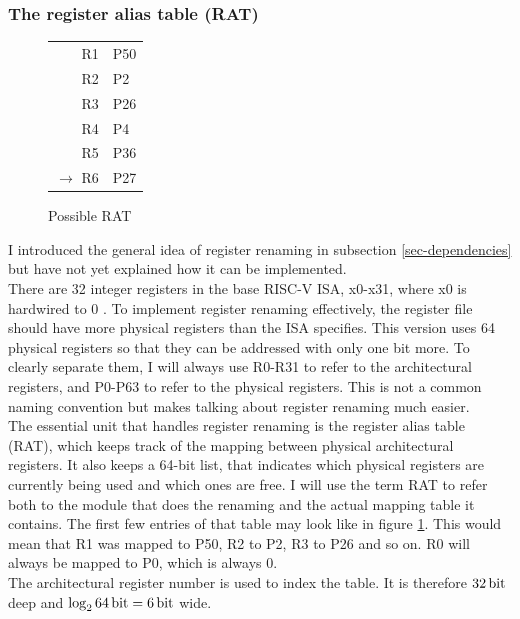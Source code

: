 \documentclass[12pt,a4paper]{article} %
\begin{document}
\subsubsection{The register alias table (RAT)} \label{sec-RAT}
\begin{figure}
	\begin{minipage}{.2\textwidth}
		\begin{tabularx} {\textwidth} {R | X|}
			R1 		& P50	\\
			R2		& P2	\\
			R3		& P26	\\
			R4		& P4	\\
			R5		& P36	\\
			$\rightarrow$ R6		& P27	\\
		\end{tabularx}
	\end{minipage}%
	\caption{Possible RAT}
	\label{fig-possibleRAT}
\end{figure}
I introduced the general idea of register renaming in subsection \ref{sec-dependencies} but have not yet explained how it can be implemented. \\
There are 32 integer registers in the base RISC-V ISA, x0-x31, where x0 is hardwired to 0 \cite[p.~9]{riscv}. To implement register renaming effectively, the register file should have more physical registers than the ISA specifies. This version uses 64 physical registers so that they can be addressed with only one bit more. To clearly separate them, I will always use R0-R31 to refer to the architectural registers, and P0-P63 to refer to the physical registers. This is not a common naming convention but makes talking about register renaming much easier.\\

The essential unit that handles register renaming is the register alias table (RAT), which keeps track of the mapping between physical architectural registers. It also keeps a 64-bit list, that indicates which physical registers are currently being used and which ones are free. I will use the term RAT to refer both to the module that does the renaming and the actual mapping table it contains. The first few entries of that table may look like in figure \ref{fig-possibleRAT}. This would mean that R1 was mapped to P50, R2 to P2, R3 to P26 and so on. R0 will always be mapped to P0, which is always 0.\\
The architectural register number is used to index the table. It is therefore $\SI{32}{\bit}$ deep and $\log_2\SI{ 64}{bit} = \SI{6}{\bit}$ wide.\\
\end{document}
